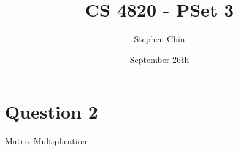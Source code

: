 \documentclass{article}
\title{CS 4820 - PSet 3}
\author{Stephen Chin}
\date{September 26th}
\begin{document}
\maketitle

\section{Question 2}
\begin{algorithm}
  \caption{Matrix Multiplication}
  \begin{algorithmic}   
  \end{algorithmic}
\end{algorithm}
\end{document}
